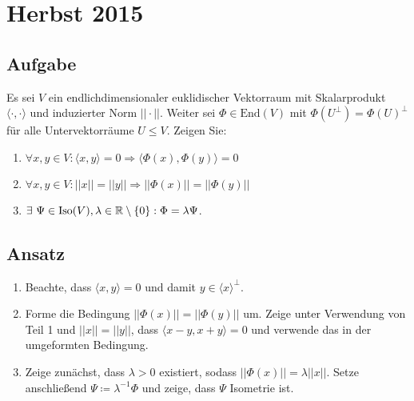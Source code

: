 \newpage

\section{Herbst 2015}

\subsection{Aufgabe}
Es sei \( V \) ein endlichdimensionaler euklidischer Vektorraum mit Skalarprodukt \( \langle \cdot, \cdot \rangle \) und induzierter Norm \( ||\cdot || \). Weiter sei \( \Phi \in \text{End}(V) \) mit \( \Phi(U^\perp) = \Phi(U)^\perp \) für alle Untervektorräume \( U \leq V \). Zeigen Sie:
\begin{enumerate}
	\item \( \forall x,y \in V: \langle x,y \rangle = 0 \Rightarrow \langle \Phi(x),\Phi(y) \rangle = 0 \) 
	\item \( \forall x,y \in V: ||x||=||y|| \Rightarrow ||\Phi(x)|| = ||\Phi(y)|| \)
	\item \( \exists \ \Psi \in \text{Iso}(V), \lambda \in \mathbb{R}\setminus\{ 0 \}: \Phi = \lambda \Psi \).
\end{enumerate}

\subsection{Ansatz}
\begin{enumerate}
	\item Beachte, dass \( \langle x,y \rangle = 0 \) und damit \( y \in \langle x \rangle^\perp \). 
	\item Forme die Bedingung \( ||\Phi(x)|| = ||\Phi(y)|| \) um. Zeige unter Verwendung von Teil 1 und \( ||x||=||y|| \), dass \( \langle x-y,x+y \rangle = 0 \) und verwende das in der umgeformten Bedingung.
	\item Zeige zunächst, dass \( \lambda > 0 \) existiert, sodass \( ||\Phi(x)|| = \lambda||x|| \). Setze anschließend \( \Psi \coloneqq \lambda^{-1}\Phi \) und zeige, dass \( \Psi \) Isometrie ist.
\end{enumerate}

